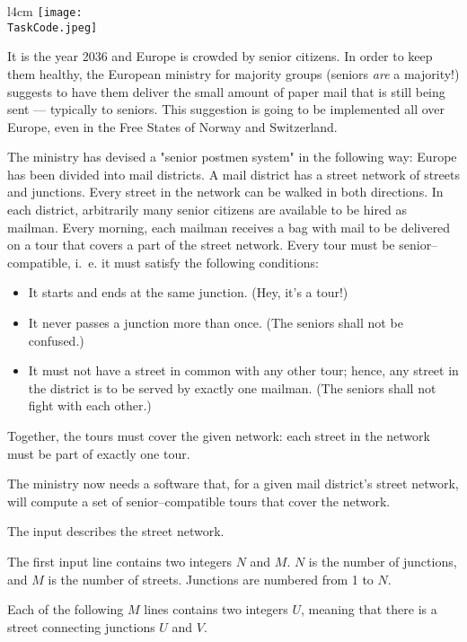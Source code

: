 \documentclass{boi2014}
\renewcommand{\TaskCode}{senior}
\begin{document}
    \begin{wrapfigure}{l}{4cm}
		\texttt{[image: \\TaskCode.jpeg]}
	\end{wrapfigure}
    It is the year 2036 and Europe is crowded by senior citizens. In order to
    keep them healthy, the European ministry for majority groups (seniors
    \emph{are} a majority!) suggests to have them deliver the small amount of
    paper mail that is still being sent --- typically to seniors. This
    suggestion is going to be implemented all over Europe, even in the Free
    States of Norway and Switzerland.

    The ministry has devised a "senior postmen system" in the following way:
    Europe has been divided into mail districts. A mail district has a street
    network of streets and junctions. Every street in the network can be walked
    in both directions. In each district, arbitrarily many senior citizens are
    available to be hired as mailman. Every morning, each mailman receives a bag
    with mail to be delivered on a tour that covers a part of the street
    network. Every tour must be senior--compatible, i.~e. it must satisfy the
    following conditions:

    \begin{itemize}
        \item It starts and ends at the same junction. (Hey, it’s a tour!)
        \item It never passes a junction more than once. (The seniors shall not
        be confused.)
        \item It must not have a street in common with any other tour; hence,
        any street in the district is to be served by exactly one mailman. (The
        seniors shall not fight with each other.)
    \end{itemize}

    Together, the tours must cover the given network: each street in the network
    must be part of exactly one tour.

    \Task
    The ministry now needs a software that, for a given mail district’s street
    network, will compute a set of senior--compatible tours that cover the
    network.

    \Input
    The input describes the street network.

    The first input line contains two integers $N$ and $M$. $N$ is the number of
    junctions, and $M$ is the number of streets. Junctions are numbered from 1
    to $N$.

    Each of the following $M$ lines contains two integers $U$, meaning that
    there is a street connecting junctions $U$ and $V$.
\end{document}
